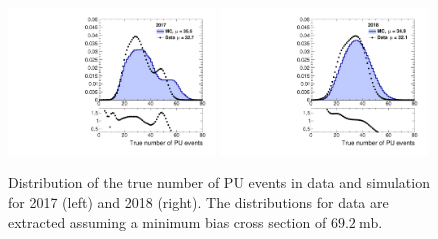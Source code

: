 \begin{figure}[ht!]
  \begin{center}
    \includegraphics[width=0.49\textwidth]{fig/pileup/pu_weights_2017.pdf}
    \includegraphics[width=0.49\textwidth]{fig/pileup/pu_weights_2018.pdf}
    \caption{
        Distribution of the true number of PU events in data and simulation for 2017 (left) and 2018 (right).
        The distributions for data are extracted assuming a minimum bias cross section of $69.2~\mathrm{mb}$.
    }
    \label{fig:purwg_true}
  \end{center}
\end{figure}
